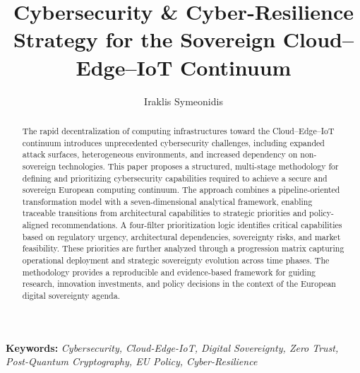 \documentclass{ieeeaccess}
\title{Cybersecurity \& Cyber-Resilience Strategy for the Sovereign Cloud--Edge--IoT Continuum}
\author{Iraklis Symeonidis}
\newenvironment{keywords}{\par\noindent\textbf{Keywords: }\itshape}{\par}
\begin{document}
\hypersetup{pageanchor=false}
\maketitle
\hypersetup{pageanchor=true}

\begin{abstract}
The rapid decentralization of computing infrastructures toward the Cloud--Edge--IoT continuum introduces unprecedented cybersecurity challenges, including expanded attack surfaces, heterogeneous environments, and increased dependency on non-sovereign technologies. This paper proposes a structured, multi-stage methodology for defining and prioritizing cybersecurity capabilities required to achieve a secure and sovereign European computing continuum. The approach combines a pipeline-oriented transformation model with a seven-dimensional analytical framework, enabling traceable transitions from architectural capabilities to strategic priorities and policy-aligned recommendations. A four-filter prioritization logic identifies critical capabilities based on regulatory urgency, architectural dependencies, sovereignty risks, and market feasibility. These priorities are further analyzed through a progression matrix capturing operational deployment and strategic sovereignty evolution across time phases. The methodology provides a reproducible and evidence-based framework for guiding research, innovation investments, and policy decisions in the context of the European digital sovereignty agenda.
\end{abstract}

\begin{keywords}
Cybersecurity, Cloud-Edge-IoT, Digital Sovereignty, Zero Trust, Post-Quantum Cryptography, EU Policy, Cyber-Resilience
\end{keywords}


 


\newpage



\newpage


\newpage



\end{document}
